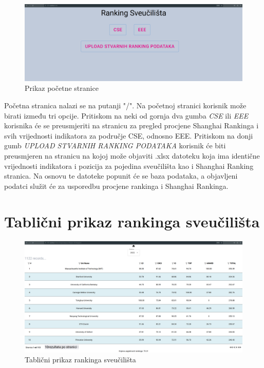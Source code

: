 \documentclass[times, utf8, zavrsni]{fer}
\begin{document}
\begin{figure}[htb]
    \hspace*{-2cm}  
    \includegraphics[scale=0.2]{homePage.png} 
    \caption{Prikaz početne stranice}
    \label{fig:homepage}
    \end{figure}
Početna stranica nalazi se na putanji "/". Na početnoj stranici korisnik može birati između tri opcije. Pritiskom na neki od gornja dva gumba \emph{CSE} ili \emph{EEE}
korisnika će se preusmjeriti na stranicu za pregled procjene Shanghai Rankinga i svih vrijednosti indikatora za područje CSE, odnosno EEE.        
Pritiskom na donji gumb \emph{UPLOAD STVARNIH RANKING PODATAKA} korisnik će biti preusmjeren na stranicu na kojoj može objaviti .xlsx datoteku koja ima 
identične vrijednosti indikatora i pozicija za pojedina sveučilišta kao i Shanghai Ranking stranica. Na osnovu te datoteke popunit će se baza podataka, a 
objavljeni podatci služit će za usporedbu procjene rankinga i Shanghai Rankinga.  
\newpage\section{Tablični prikaz rankinga sveučilišta}
\begin{figure}[htb]
    \hspace*{-2cm}  
    \includegraphics[scale=0.2]{tablica.png} 
    \caption{Tablični prikaz rankinga sveučilišta}
    \label{fig:tablica}
    \end{figure}
\end{document}
